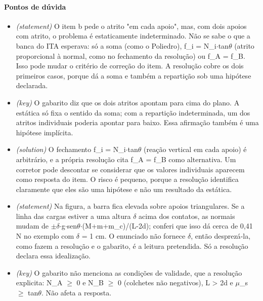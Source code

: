 \documentclass{article}%
\begin{document}
\paragraph{Pontos de dúvida}%
\begin{itemize}%
\item%
\textit{(statement)} O item b pede o atrito "em cada apoio", mas, com dois apoios com atrito, o problema é estaticamente indeterminado. Não se sabe o que a banca do ITA esperava: só a soma (como o Poliedro), f\_i = N\_i$\cdot$tan$\theta$ (atrito proporcional à normal, como no fechamento da resolução) ou f\_A = f\_B. Isso pode mudar o critério de correção do item. A resolução cobre os dois primeiros casos, porque dá a soma e também a repartição sob uma hipótese declarada.%
\item%
\textit{(key)} O gabarito diz que os dois atritos apontam para cima do plano. A estática só fixa o sentido da soma; com a repartição indeterminada, um dos atritos individuais poderia apontar para baixo. Essa afirmação também é uma hipótese implícita.%
\item%
\textit{(solution)} O fechamento f\_i = N\_i$\cdot$tan$\theta$ (reação vertical em cada apoio) é arbitrário, e a própria resolução cita f\_A = f\_B como alternativa. Um corretor pode descontar se considerar que os valores individuais aparecem como resposta do item. O risco é pequeno, porque a resolução identifica claramente que eles são uma hipótese e não um resultado da estática.%
\item%
\textit{(statement)} Na figura, a barra fica elevada sobre apoios triangulares. Se a linha das cargas estiver a uma altura $\delta$ acima dos contatos, as normais mudam de $\pm$$\delta$$\cdot$g$\cdot$sen$\theta$$\cdot$(M+m+m\_c)/(L-2d); conferi que isso dá cerca de 0,41 N no exemplo com $\delta$ = 1 cm. O enunciado não fornece $\delta$, então desprezá{-}la, como fazem a resolução e o gabarito, é a leitura pretendida. Só a resolução declara essa idealização.%
\item%
\textit{(key)} O gabarito não menciona as condições de validade, que a resolução explicita: N\_A $\geq$ 0 e N\_B $\geq$ 0 (colchetes não negativos), L > 2d e $\mu$\_s $\geq$ tan$\theta$. Não afeta a resposta.%
\end{itemize}%
\end{document}
